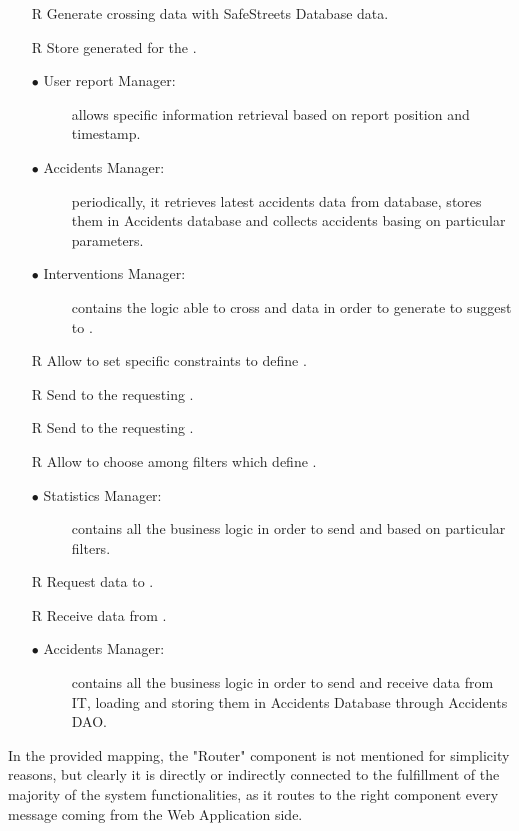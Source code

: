 \documentclass[../DD.tex]{subfiles}
\begin{document}
\begin{itemize}
	\item[R\subs{16}]Generate  crossing   data with SafeStreets Database data.
	\item[R\subs{17}]Store generated  for the .
	\begin{description}
	\item[$\bullet$ User report Manager:] allows specific  information retrieval based on report position and timestamp.
	\item[$\bullet$ Accidents Manager:] periodically, it retrieves latest accidents data from  database, stores them in Accidents database and collects accidents basing on particular parameters.
	\item[$\bullet$ Interventions Manager:] contains the logic able to cross  and  data in order to generate  to suggest to .
	\end{description}
	
	\item[R\subs{18}]Allow  to set specific constraints to define .
	\item[R\subs{19}]Send  to the requesting .
	\item[R\subs{24}]Send  to the requesting .
	\item[R\subs{23}]Allow  to choose among filters which define .
	\begin{description}
	\item[$\bullet$ Statistics Manager:] contains all the business logic in order to send  and   based on particular filters.
	\end{description}
	
	\item[R\subs{27}]Request  data to .
	\item[R\subs{28}]Receive  data from .
		\begin{description}
		\item[$\bullet$ Accidents Manager:] contains all the business logic in order to send and receive  data from  IT, loading and storing them in Accidents Database through Accidents DAO.
	\end{description}

\end{itemize}

In the provided mapping, the "Router" component is not mentioned for simplicity reasons, but clearly it is directly or indirectly connected to the fulfillment of the majority of the system functionalities, as it routes to the right component every message coming from the Web Application side.
\end{document}
